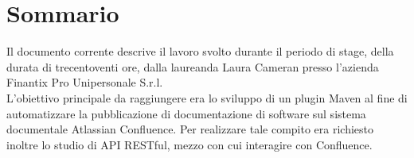 
\cleardoublepage
{}
{}
\begingroup
\let\clearpage\relax
\let\cleardoublepage\relax
\let\cleardoublepage\relax

\chapter*{Sommario}

Il documento corrente descrive il lavoro svolto durante il periodo di stage, della durata di trecentoventi ore, dalla laureanda Laura Cameran presso l'azienda Finantix Pro Unipersonale S.r.l. \\
L'obiettivo principale da raggiungere era lo sviluppo di un plugin Maven al fine di automatizzare la pubblicazione di documentazione di software sul sistema documentale Atlassian Confluence. 
Per realizzare tale compito era richiesto inoltre lo studio di API RESTful, mezzo con cui interagire con Confluence.

%
%

\endgroup			

\vfill

